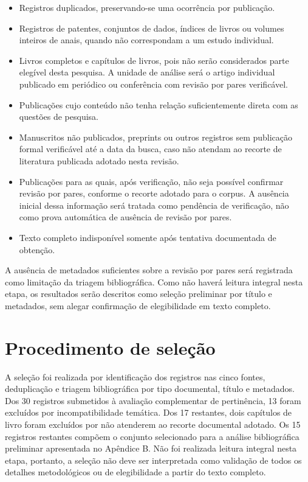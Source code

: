 \begin{itemize}
    \item Registros duplicados, preservando-se uma ocorrência por publicação.
    \item Registros de patentes, conjuntos de dados, índices de livros ou
    volumes inteiros de anais, quando não correspondam a um estudo
    individual.
    \item Livros completos e capítulos de livros, pois não serão considerados
    parte elegível desta pesquisa. A unidade de análise será o artigo
    individual publicado em periódico ou conferência com revisão por pares
    verificável.
    \item Publicações cujo conteúdo não tenha relação suficientemente
    direta com as questões de pesquisa.
    \item Manuscritos não publicados, preprints ou outros registros sem
    publicação formal verificável até a data da busca, caso não atendam ao
    recorte de literatura publicada adotado nesta revisão.
    \item Publicações para as quais, após verificação, não seja possível
    confirmar revisão por pares, conforme o recorte adotado para o corpus.
    A ausência inicial dessa informação será tratada como pendência de
    verificação, não como prova automática de ausência de revisão por pares.
    \item Texto completo indisponível somente após tentativa documentada
    de obtenção.
\end{itemize}

A ausência de metadados suficientes sobre a revisão por pares será
registrada como limitação da triagem bibliográfica. Como não haverá leitura
integral nesta etapa, os resultados serão descritos como seleção preliminar
por título e metadados, sem alegar confirmação de elegibilidade em texto completo.

\section{Procedimento de seleção}

A seleção foi realizada por identificação dos registros nas cinco fontes,
deduplicação e triagem bibliográfica por tipo documental, título e metadados.
Dos 30 registros submetidos à avaliação complementar de pertinência, 13 foram
excluídos por incompatibilidade temática. Dos 17 restantes, dois capítulos de
livro foram excluídos por não atenderem ao recorte documental adotado. Os 15
registros restantes compõem o conjunto selecionado para a análise bibliográfica
preliminar apresentada no Apêndice B. Não foi realizada leitura integral nesta
etapa, portanto, a seleção não deve ser interpretada como validação de todos
os detalhes metodológicos ou de elegibilidade a partir do texto completo.

